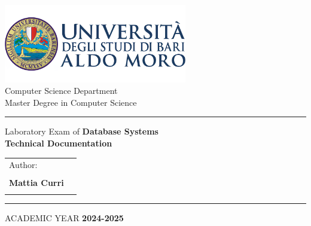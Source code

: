 
\begin{titlepage}
    \begin{center}
        \includegraphics[width=0.6\textwidth]{img/uniba_logo.png}\\
        \vspace{1cm}
        {\large Computer Science Department}\\
        \vspace{1cm}
        {\large Master Degree in Computer Science}\\
        \vspace{1cm}
        \hrule 
        \vspace{1.5cm}
        \vspace{0.5cm}
        {\large Laboratory Exam of \textbf{Database Systems}}\\
        \vspace{1.5cm}
        {\LARGE \textbf{Technical Documentation}}
        \\ %
        \vspace{1.2cm}

        \vfill
        
        \begin{tabularx}{\textwidth}{@{}Xr@{}}
          {\large Author:}  \\  \\
          {\large \textbf{Mattia Curri}} \\ \\
        \end{tabularx}
          
        \vspace{1cm}
        \hrule
        \vspace{1cm}
        {\large ACADEMIC YEAR \textbf{2024{-}2025}}
    \end{center}
\end{titlepage}